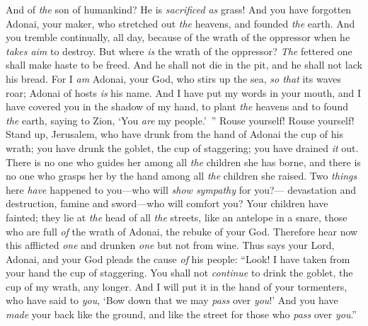 \begin{biblechapter}
And of \textit{the} son of humankind? He is \textit{sacrificed} \textit{as} grass!
\verse And you have forgotten Adonai, your maker, 
who stretched out \textit{the} heavens, 
and founded \textit{the} earth. 
And you tremble continually, all day, 
because of the wrath of the oppressor 
when he \textit{takes aim} to destroy. 
But where \textit{is} the wrath of the oppressor?
\verse \textit{The} fettered one shall make haste to be freed. 
And he shall not die in the pit, 
and he shall not lack his bread.
\verse For I \textit{am} Adonai, your God, 
who stirs up the sea, \textit{so that} its waves roar; 
Adonai of hosts \textit{is} his name.
\verse And I have put my words in your mouth, 
and I have covered you in the shadow of my hand, 
to plant \textit{the} heavens 
and to found \textit{the} earth, 
saying to Zion, ‘You \textit{are} my people.’ ”
\verse Rouse yourself! Rouse yourself! 
Stand up, Jerusalem, who have drunk from the hand of Adonai the cup of his wrath; 
you have drunk the goblet, the cup of staggering; 
you have drained \textit{it} out.
\verse There is no one who guides her among all \textit{the} children she has borne, 
and there is no one who grasps her by the hand among all \textit{the} children she raised.
\verse Two \textit{things} here \textit{have} happened to you—who will \textit{show sympathy} for you?— 
devastation and destruction, famine and sword—who will comfort you?
\verse Your children have fainted; 
they lie at \textit{the} head of all \textit{the} streets, like an antelope in a snare, 
those who are full \textit{of} the wrath of Adonai, 
the rebuke of your God.
\verse Therefore hear now this afflicted \textit{one} 
and drunken \textit{one} but not from wine.
\verse Thus says your Lord, Adonai, 
and your God pleads the cause \textit{of} his people: 
“Look! I have taken from your hand the cup of staggering. 
You shall not \textit{continue} to drink the goblet, the cup of my wrath, any longer.
\verse And I will put it in the hand of your tormenters, 
who have said to \textit{you}, ‘Bow down that we may \textit{pass} over \textit{you}!’ 
And you have \textit{made} your back like the ground, 
and like the street for those who \textit{pass} over \textit{you}.”
\end{biblechapter}

